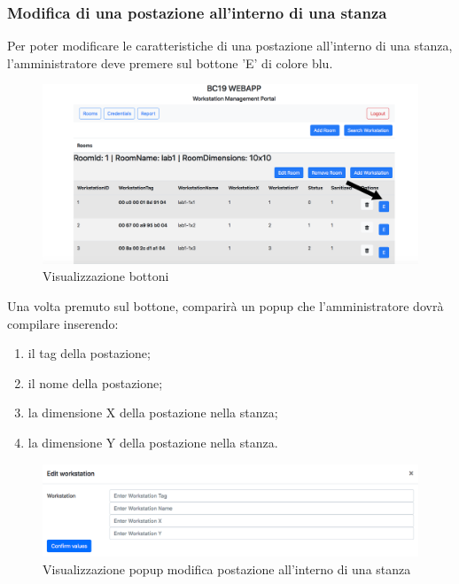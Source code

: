 \subsubsection{Modifica di una postazione all'interno di una stanza}
Per poter modificare le caratteristiche di una postazione all'interno di una stanza, l'amministratore deve premere sul bottone 'E' di colore blu.
\begin{figure}[H]
	\centering
	\includegraphics[width=15cm]{res/images/bottoneEditWorkstation.png}
	\caption{Visualizzazione bottoni}
\end{figure}
Una volta premuto sul bottone, comparirà un popup che l'amministratore dovrà compilare inserendo:
\begin{enumerate}
\item il tag della postazione;
\item il nome della postazione;
\item la dimensione X della postazione nella stanza;
\item la dimensione Y della postazione nella stanza.
\end{enumerate}
\begin{figure}[H]
	\centering
	\includegraphics[width=15cm]{res/images/editWorkstation.png}
	\caption{Visualizzazione popup modifica postazione all'interno di una stanza}
\end{figure}

